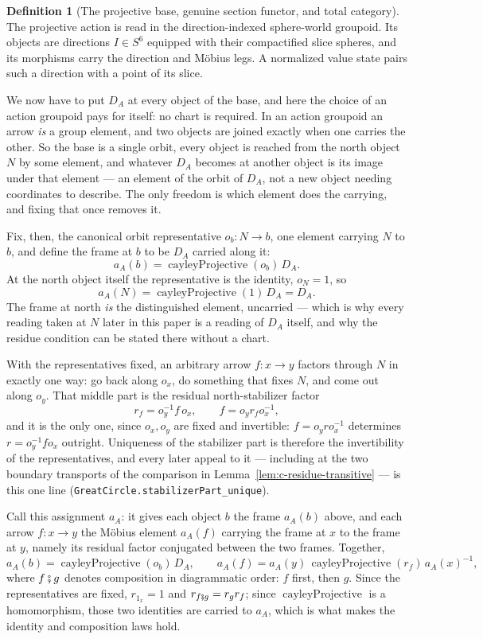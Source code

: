 \documentclass[11pt]{article}
\theoremstyle{plain}
\theoremstyle{definition}
\newtheorem{definition}[theorem]{Definition}
\theoremstyle{remark}
\begin{document}
\begin{definition}[The projective base, genuine section functor, and total category]
The projective action is read in the direction-indexed sphere-world groupoid. Its objects are
directions $I\in S^6$ equipped with their compactified slice spheres, and its morphisms carry the
direction and M\"obius legs. A normalized value state pairs such a direction with a point of its
slice.

We now have to put $D_A$ at every object of the base, and here the choice of an
action groupoid pays for itself: no chart is required. In an action groupoid an
arrow \emph{is} a group element, and two objects are joined exactly when one
carries the other. So the base is a single orbit, every object is reached from
the north object $N$ by some element, and whatever $D_A$ becomes at another
object is its image under that element --- an element of the orbit of $D_A$,
not a new object needing coordinates to describe. The only freedom is which
element does the carrying, and fixing that once removes it.

Fix, then, the canonical orbit representative $o_b:N\to b$, one element carrying
$N$ to $b$, and define the frame at $b$ to be $D_A$ carried along it:
\[
  a_A(b)=\operatorname{cayleyProjective}(o_b)\,D_A .
\]
At the north object itself the representative is the identity, $o_N=1$, so
\[
  a_A(N)=\operatorname{cayleyProjective}(1)\,D_A=D_A .
\]
The frame at north \emph{is} the distinguished element, uncarried --- which is
why every reading taken at $N$ later in this paper is a reading of $D_A$ itself,
and why the residue condition can be stated there without a chart.

With the representatives fixed, an arbitrary arrow $f:x\to y$ factors through
$N$ in exactly one way: go back along $o_x$, do something that fixes $N$, and
come out along $o_y$. That middle part is the residual north-stabilizer factor
\[
  r_f=o_y^{-1}f\,o_x,\qquad
  f=o_y r_f o_x^{-1},
\]
and it is the only one, since $o_x,o_y$ are fixed and invertible: $f=o_yro_x^{-1}$
determines $r=o_y^{-1}fo_x$ outright. Uniqueness of the stabilizer part is
therefore the invertibility of the representatives, and every later appeal to it
--- including at the two boundary transports of the comparison in
Lemma~\ref{lem:c-residue-transitive} --- is this one line
\textup{(}\texttt{GreatCircle.stabilizerPart\_unique}\textup{)}.

Call this assignment $a_A$: it gives each object $b$ the frame $a_A(b)$ above,
and each arrow $f:x\to y$ the M\"obius element $a_A(f)$ carrying the frame at
$x$ to the frame at $y$, namely its residual factor conjugated between the two
frames. Together,
\[
  a_A(b)=\operatorname{cayleyProjective}(o_b)\,D_A,\qquad
  a_A(f)=a_A(y)\,\operatorname{cayleyProjective}(r_f)\,a_A(x)^{-1},
                              \tag{OS}\label{eq:orbit-stabilizer}
\]
where $f\fatsemi g$ denotes composition in diagrammatic order: $f$ first, then
$g$. Since the representatives are fixed, $r_{1_x}=1$ and
$r_{f\fatsemi g}=r_g r_f$; since $\operatorname{cayleyProjective}$ is a
homomorphism, those two identities are carried to $a_A$, which is what makes
the identity and composition laws hold.


\end{definition}
\end{document}
